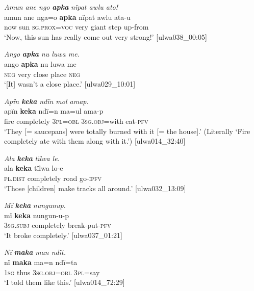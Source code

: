 \ea%
    \label{ex:otherwc:101}
          \textit{Amun ane ngo} \textbf{\textit{apka}} \textit{nïpat awlu ato!}\\
\gll    amun  ane  nga{}=o      \textbf{apka}  nïpat  awlu  ata-u\\
    now  sun  \textsc{sg.prox{}=voc} very  giant  step  up-from\\
\glt `Now, this sun has really come out very strong!’ [ulwa038\_00:05]
\z

\ea%
    \label{ex:otherwc:102}
          \textit{Ango} \textbf{\textit{apka}} \textit{nu luwa me.}\\
\gll    ango  \textbf{apka}  nu    luwa  me\\
    \textsc{neg}  very  close  place  \textsc{neg}\\
\glt `[It] wasn’t a close place.’ [ulwa029\_10:01]
\z

\ea%
    \label{ex:otherwc:103}
          \textit{Apïn} \textbf{\textit{keka}} \textit{ndïn mol amap.}\\
\gll    apïn  \textbf{keka}      ndï=n    ma=ul      ama-p\\
    fire    completely  3\textsc{pl=obl}  3\textsc{sg.obj}=with  eat-\textsc{pfv}\\
\glt `They [= saucepans] were totally burned with it [= the house].’ (Literally ‘Fire completely ate with them along with it.’) [ulwa014\_32:40]
\z

\ea%
    \label{ex:otherwc:104}
          \textit{Ala} \textbf{\textit{keka}} \textit{tïlwa le.}\\
\gll    ala      \textbf{keka}      tïlwa  lo-e\\
    \textsc{pl.dist}  completely  road  go-\textsc{ipfv}\\
\glt `Those [children] make tracks all around.’ [ulwa032\_13:09]
\z

\ea%
    \label{ex:otherwc:105}
          \textit{Mï} \textbf{\textit{keka}} \textit{nungunup.}\\
\gll    mï      \textbf{keka}      nungun-u-p\\
    3\textsc{sg.subj}  completely  break-put-\textsc{pfv}\\
\glt `It broke completely.’ [ulwa037\_01:21]
\z

\ea%
    \label{ex:otherwc:106}
          \textit{Nï} \textbf{\textit{maka}} \textit{man ndït.}\\
\gll    nï    \textbf{maka}  ma=n      ndï=ta\\
    1\textsc{sg}  thus  3\textsc{sg.obj=obl}  3\textsc{pl}=say\\
\glt `I told them like this.’ [ulwa014\_72:29]
\z

